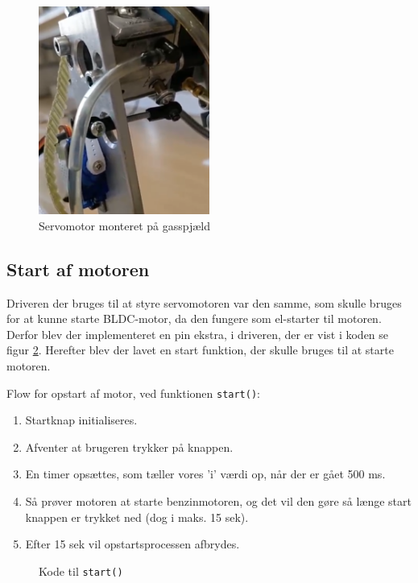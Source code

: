   
\begin{figure}[h]
  \centering
  \includegraphics[width=0.5\textwidth]{./figurer/mots5.png}
  \caption{Servomotor monteret på gasspjæld}
  \label{fig:mots5}
\end{figure}

  
\subsection{Start af motoren}
\label{sec:start-af-motoren}

Driveren der bruges til at styre servomotoren var den samme, som skulle bruges for at kunne starte BLDC-motor, da den fungere som el-starter til motoren. Derfor blev der implementeret en pin ekstra, i driveren, der er vist i koden se figur \ref{fig:kodes3}. Herefter blev der lavet en start funktion, der skulle bruges til at starte motoren.

Flow for opstart af motor, ved funktionen \lstinline{start()}:

\begin{enumerate}
\item Startknap initialiseres.
\item Afventer at brugeren trykker på knappen.
\item En timer opsættes, som tæller vores ’i’ værdi op, når der er gået 500 ms.
\item Så prøver motoren at starte benzinmotoren, og det vil den gøre så længe start knappen er trykket ned (dog i maks. 15 sek).
\item Efter 15 sek vil opstartsprocessen afbrydes.
\end{enumerate}

\begin{figure}[h]
  \centering
  
  \caption{Kode til \lstinline{start()}}
  \label{fig:kodes3}
\end{figure}

